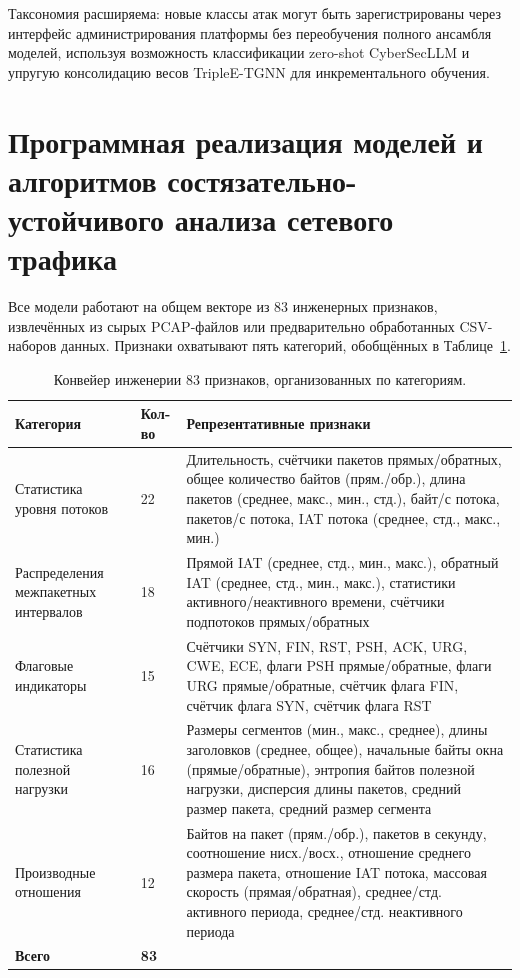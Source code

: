 Таксономия расширяема: новые классы атак могут быть зарегистрированы через интерфейс администрирования платформы без переобучения полного ансамбля моделей, используя возможность классификации zero-shot CyberSecLLM и упругую консолидацию весов TripleE-TGNN для инкрементального обучения.


\section{Программная реализация моделей и алгоритмов состязательно-устойчивого анализа сетевого трафика}
\label{sec:features}

Все модели работают на общем векторе из 83 инженерных признаков, извлечённых из сырых PCAP-файлов или предварительно обработанных CSV-наборов данных. Признаки охватывают пять категорий, обобщённых в Таблице~\ref{tab:features}.

\begin{table}[htbp]
\centering
\caption{Конвейер инженерии 83 признаков, организованных по категориям.}
\label{tab:features}
\small
\begin{tabular}{p{3.5cm} p{1.5cm} p{8.5cm}}
\toprule
\textbf{Категория} & \textbf{Кол-во} & \textbf{Репрезентативные признаки} \\
\midrule
Статистика уровня потоков & 22 & Длительность, счётчики пакетов прямых/обратных, общее количество байтов (прям./обр.), длина пакетов (среднее, макс., мин., стд.), байт/с потока, пакетов/с потока, IAT потока (среднее, стд., макс., мин.) \\
\addlinespace
Распределения межпакетных интервалов & 18 & Прямой IAT (среднее, стд., мин., макс.), обратный IAT (среднее, стд., мин., макс.), статистики активного/неактивного времени, счётчики подпотоков прямых/обратных \\
\addlinespace
Флаговые индикаторы & 15 & Счётчики SYN, FIN, RST, PSH, ACK, URG, CWE, ECE, флаги PSH прямые/обратные, флаги URG прямые/обратные, счётчик флага FIN, счётчик флага SYN, счётчик флага RST \\
\addlinespace
Статистика полезной нагрузки & 16 & Размеры сегментов (мин., макс., среднее), длины заголовков (среднее, общее), начальные байты окна (прямые/обратные), энтропия байтов полезной нагрузки, дисперсия длины пакетов, средний размер пакета, средний размер сегмента \\
\addlinespace
Производные отношения & 12 & Байтов на пакет (прям./обр.), пакетов в секунду, соотношение нисх./восх., отношение среднего размера пакета, отношение IAT потока, массовая скорость (прямая/обратная), среднее/стд. активного периода, среднее/стд. неактивного периода \\
\midrule
\textbf{Всего} & \textbf{83} & \\
\bottomrule
\end{tabular}
\end{table}

